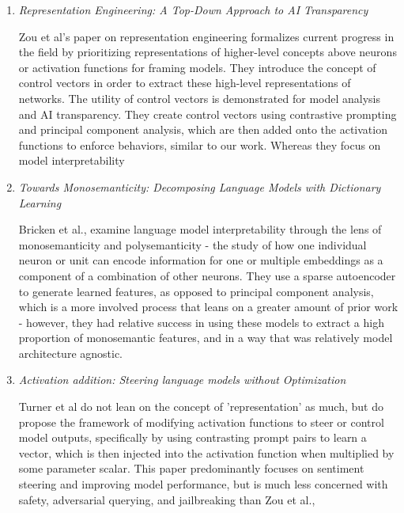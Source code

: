 \documentclass[11pt,a4paper]{article}
\begin{document}
\begin{enumerate}


\item \emph{Representation Engineering: A Top-Down Approach to AI Transparency} ~\cite{zou2023representation}

Zou et al's paper on representation engineering formalizes current progress in the field by prioritizing representations of higher-level concepts above neurons or activation functions for framing models. They introduce the concept of control vectors in order to extract these high-level representations of networks. The utility of control vectors is demonstrated for model analysis and AI transparency. They create control vectors using contrastive prompting and principal component analysis, which are then added onto the activation functions to enforce behaviors, similar to our work. Whereas they focus on model interpretability 



\item \emph{Towards Monosemanticity: Decomposing Language Models with Dictionary Learning} ~\cite{bricken2023towards}

Bricken et al., examine language model interpretability through the lens of monosemanticity and polysemanticity - the study of how one individual neuron or unit can encode information for one or multiple embeddings as a component of a combination of other neurons. They use a sparse autoencoder to generate learned features, as opposed to principal component analysis, which is a more involved process that leans on a greater amount of prior work - however, they had relative success in using these models to extract a high proportion of monosemantic features, and in a way that was relatively model architecture agnostic.

\item \emph{Activation addition: Steering language models without Optimization}~\cite{turner2023activation}

Turner et al do not lean on the concept of 'representation' as much, but do propose the framework of modifying activation functions to steer or control model outputs, specifically by using contrasting prompt pairs to learn a vector, which is then injected into the activation function when multiplied by some parameter scalar.  This paper predominantly focuses on sentiment steering and improving model performance, but is much less concerned with safety, adversarial querying, and jailbreaking than Zou et al.,


\end{enumerate}
\end{document}
